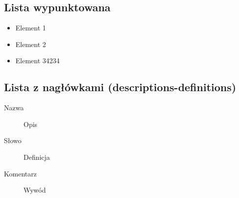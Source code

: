 \subsection{Lista wypunktowana}

\begin{itemize}
\item Element 1
\item Element 2
\item Element 34234
\end{itemize}

\subsection{Lista z nagłówkami (descriptions-definitions)}

\begin{description}
\item[Nazwa] Opis
\item[Słowo] Definicja
\item[Komentarz] Wywód
\end{description}

